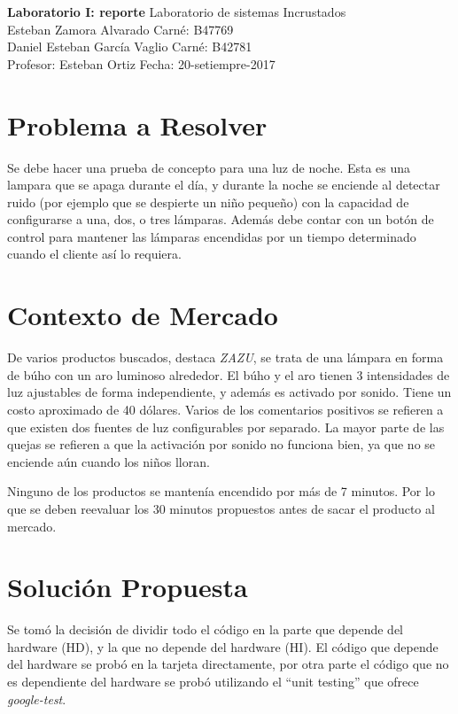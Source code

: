 

\noindent
\large\textbf{Laboratorio I: reporte} \hfill Laboratorio de sistemas Incrustados \\
\normalsize Esteban Zamora Alvarado \hfill Carné: B47769 \\
Daniel Esteban García Vaglio \hfill Carné: B42781 \\
Profesor: Esteban Ortiz  \hfill Fecha: 20-setiempre-2017 \\

\section{Problema a Resolver}
Se debe hacer una prueba de concepto para una luz de noche. Esta es una lampara que se apaga durante
el día, y durante la noche se enciende al detectar ruido (por ejemplo que se despierte un niño pequeño)
con la capacidad de configurarse a una, dos, o tres lámparas. Además debe contar con un botón de
control para mantener las lámparas encendidas por un tiempo determinado cuando el cliente así lo
requiera. 

\section{Contexto de Mercado}

De varios productos buscados, destaca \textit{ZAZU}, se trata de una lámpara en forma de búho con un
aro luminoso alrededor. El búho y el aro tienen 3 intensidades de luz ajustables de forma
independiente, y además es activado por sonido. Tiene un costo aproximado de 40 dólares. Varios de
los comentarios positivos se refieren a que existen dos fuentes de luz configurables por
separado. La mayor parte de las quejas se refieren a que la activación por sonido no funciona bien,
ya que no se enciende aún cuando los niños lloran.

Ninguno de los productos se mantenía encendido por más de 7 minutos. Por lo que se deben reevaluar
los 30 minutos propuestos antes de sacar el producto al mercado.

\section{Solución Propuesta}

Se tomó la decisión de dividir todo el código en la parte que depende del hardware (HD), y la que no
depende del hardware (HI).  El código que depende del hardware se probó en la tarjeta directamente, por
otra parte el código que no es dependiente del hardware se probó utilizando el ``unit testing'' que
ofrece \textit{google-test}.


